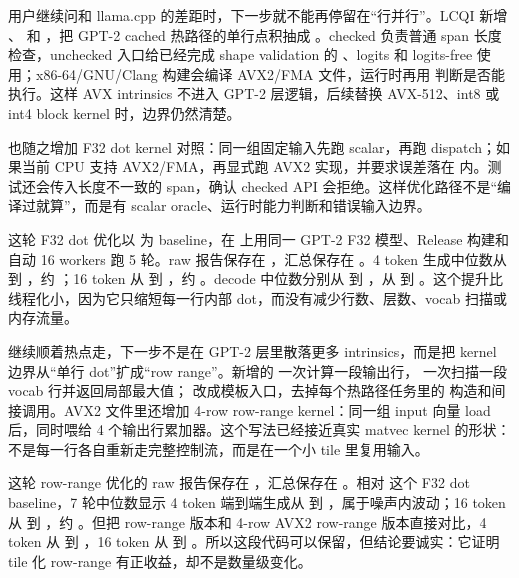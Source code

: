 用户继续问和 llama.cpp 的差距时，下一步就不能再停留在“行并行”。LCQI 新增 、 和 ，把 GPT-2 cached 热路径的单行点积抽成 。checked  负责普通 span 长度检查，unchecked 入口给已经完成 shape validation 的 、logits 和 logits-free  使用；x86-64/GNU/Clang 构建会编译 AVX2/FMA 文件，运行时再用  判断是否能执行。这样 AVX intrinsics 不进入 GPT-2 层逻辑，后续替换 AVX-512、int8 或 int4 block kernel 时，边界仍然清楚。

 也随之增加 F32 dot kernel 对照：同一组固定输入先跑 scalar，再跑 dispatch；如果当前 CPU 支持 AVX2/FMA，再显式跑 AVX2 实现，并要求误差落在  内。测试还会传入长度不一致的 span，确认 checked API 会拒绝。这样优化路径不是“编译过就算”，而是有 scalar oracle、运行时能力判断和错误输入边界。

这轮 F32 dot 优化以  为 baseline，在  上用同一 GPT-2 F32 模型、Release 构建和  自动 16 workers 跑 5 轮。raw 报告保存在 ，汇总保存在 。4 token 生成中位数从  到 ，约 ；16 token 从  到 ，约 。decode 中位数分别从  到 ，从  到 。这个提升比线程化小，因为它只缩短每一行内部 dot，而没有减少行数、层数、vocab 扫描或内存流量。

继续顺着热点走，下一步不是在 GPT-2 层里散落更多 intrinsics，而是把 kernel 边界从“单行 dot”扩成“row range”。新增的  一次计算一段输出行， 一次扫描一段 vocab 行并返回局部最大值； 改成模板入口，去掉每个热路径任务里的  构造和间接调用。AVX2 文件里还增加 4-row row-range kernel：同一组 input 向量 load 后，同时喂给 4 个输出行累加器。这个写法已经接近真实 matvec kernel 的形状：不是每一行各自重新走完整控制流，而是在一个小 tile 里复用输入。

这轮 row-range 优化的 raw 报告保存在 ，汇总保存在 。相对  这个 F32 dot baseline，7 轮中位数显示 4 token 端到端生成从  到 ，属于噪声内波动；16 token 从  到 ，约 。但把 row-range 版本和 4-row AVX2 row-range 版本直接对比，4 token 从  到 ，16 token 从  到 。所以这段代码可以保留，但结论要诚实：它证明 tile 化 row-range 有正收益，却不是数量级变化。

